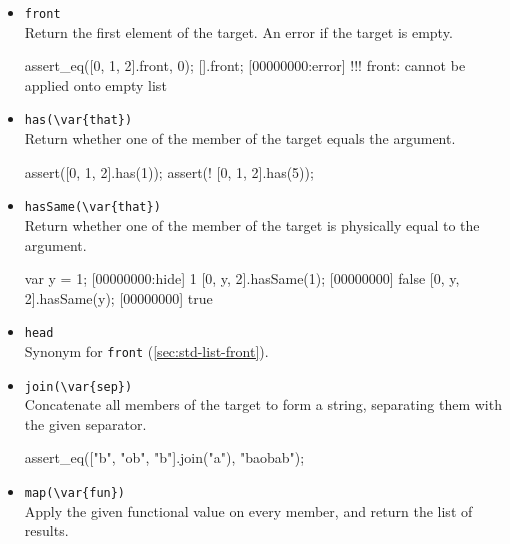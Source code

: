 \begin{itemize}
\begin{urbiscript}[firstnumber=last]
\end{urbiscript}

\item \lstinline|front|\\
\label{sec:std-list-front}
Return the first element of the target. An error if the target is
empty.

\begin{urbiscript}[firstnumber=last]
assert_eq([0, 1, 2].front, 0);
[].front;
[00000000:error] !!! front: cannot be applied onto empty list
\end{urbiscript}

\item \lstinline|has(\var{that})|\\
Return whether one of the member of the target equals the argument.

\begin{urbiscript}[firstnumber=last]
assert([0, 1, 2].has(1));
assert(! [0, 1, 2].has(5));
\end{urbiscript}

\item \lstinline|hasSame(\var{that})|\\

Return whether one of the member of the target is physically equal to
the argument.

\begin{urbiscript}[firstnumber=last]
var y = 1;
[00000000:hide] 1
[0, y, 2].hasSame(1);
[00000000] false
[0, y, 2].hasSame(y);
[00000000] true
\end{urbiscript}

\item \lstinline|head|\\
Synonym for \lstinline|front| (\autoref{sec:std-list-front}).

\item \lstinline|join(\var{sep})|\\
Concatenate all members of the target to form a string, separating
them with the given separator.

\begin{urbiscript}[firstnumber=last]
assert_eq(["b", "ob", "b"].join("a"), "baobab");
\end{urbiscript}

\item \lstinline|map(\var{fun})|\\
Apply the given functional value on every member, and return the list
of results.



\end{itemize}
